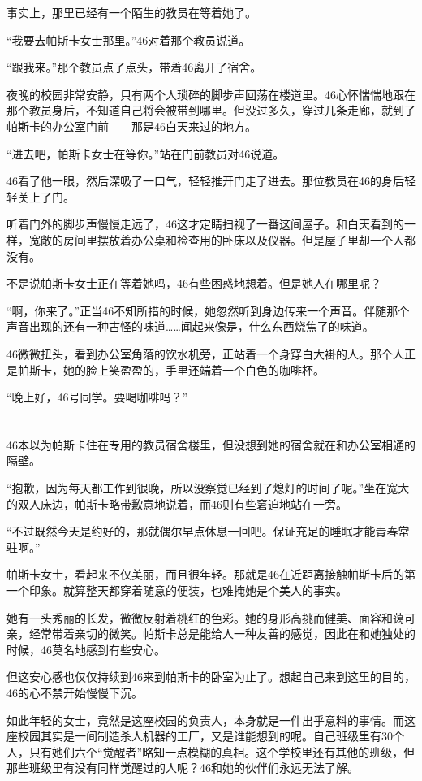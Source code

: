事实上，那里已经有一个陌生的教员在等着她了。

“我要去帕斯卡女士那里。”46对着那个教员说道。

“跟我来。”那个教员点了点头，带着46离开了宿舍。

夜晚的校园非常安静，只有两个人琐碎的脚步声回荡在楼道里。46心怀惴惴地跟在那个教员身后，不知道自己将会被带到哪里。但没过多久，穿过几条走廊，就到了帕斯卡的办公室门前——那是46白天来过的地方。

“进去吧，帕斯卡女士在等你。”站在门前教员对46说道。

46看了他一眼，然后深吸了一口气，轻轻推开门走了进去。那位教员在46的身后轻轻关上了门。

听着门外的脚步声慢慢走远了，46这才定睛扫视了一番这间屋子。和白天看到的一样，宽敞的房间里摆放着办公桌和检查用的卧床以及仪器。但是屋子里却一个人都没有。

不是说帕斯卡女士正在等着她吗，46有些困惑地想着。但是她人在哪里呢？

“啊，你来了。”正当46不知所措的时候，她忽然听到身边传来一个声音。伴随那个声音出现的还有一种古怪的味道……闻起来像是，什么东西烧焦了的味道。

46微微扭头，看到办公室角落的饮水机旁，正站着一个身穿白大褂的人。那个人正是帕斯卡，她的脸上笑盈盈的，手里还端着一个白色的咖啡杯。

“晚上好，46号同学。要喝咖啡吗？”

\section*{}

46本以为帕斯卡住在专用的教员宿舍楼里，但没想到她的宿舍就在和办公室相通的隔壁。

“抱歉，因为每天都工作到很晚，所以没察觉已经到了熄灯的时间了呢。”坐在宽大的双人床边，帕斯卡略带歉意地说着，而46则有些窘迫地站在一旁。

“不过既然今天是约好的，那就偶尔早点休息一回吧。保证充足的睡眠才能青春常驻啊。”

帕斯卡女士，看起来不仅美丽，而且很年轻。那就是46在近距离接触帕斯卡后的第一个印象。就算整天都穿着随意的便装，也难掩她是个美人的事实。

她有一头秀丽的长发，微微反射着桃红的色彩。她的身形高挑而健美、面容和蔼可亲，经常带着亲切的微笑。帕斯卡总是能给人一种友善的感觉，因此在和她独处的时候，46莫名地感到有些安心。

但这安心感也仅仅持续到46来到帕斯卡的卧室为止了。想起自己来到这里的目的，46的心不禁开始慢慢下沉。

如此年轻的女士，竟然是这座校园的负责人，本身就是一件出乎意料的事情。而这座校园其实是一间制造杀人机器的工厂，又是谁能想到的呢。自己班级里有30个人，只有她们六个“觉醒者”略知一点模糊的真相。这个学校里还有其他的班级，但那些班级里有没有同样觉醒过的人呢？46和她的伙伴们永远无法了解。

